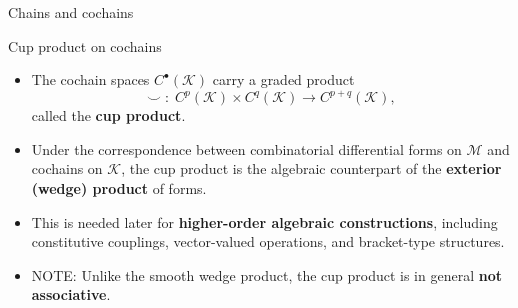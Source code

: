 \begin{frame}{Chains and cochains}
\end{frame}

\begin{frame}{Cup product on cochains}

\begin{itemize}

\item The cochain spaces \(C^\bullet(\mathcal{K})\) carry a graded product
\[
\smile \;:\; C^p(\mathcal{K}) \times C^q(\mathcal{K}) \longrightarrow C^{p+q}(\mathcal{K}),
\]
called the \textbf{cup product}. \href{https://www.sciencedirect.com/science/article/pii/S0307904X22002657\#bib0023}{}

\vspace{0.2cm}

\item Under the correspondence between combinatorial differential forms on \(\mathcal{M}\) and cochains on \(\mathcal{K}\), the cup product is the algebraic counterpart of the \textbf{exterior (wedge) product} of forms.

\vspace{0.2cm}

\item This is needed later for
\textbf{higher-order algebraic constructions},
including constitutive couplings, vector-valued operations, and bracket-type structures.

\vspace{0.2cm}

\item NOTE: Unlike the smooth wedge product, the cup product is in general \textbf{not associative}.

\end{itemize}

\end{frame}


